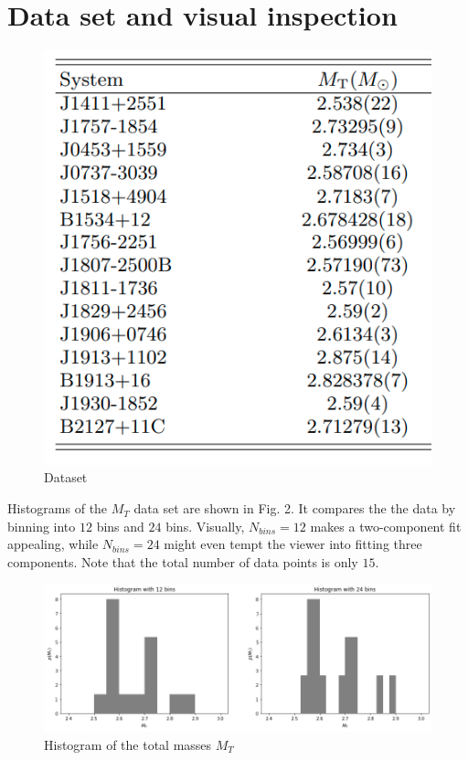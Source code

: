 \documentclass[journal,12pt,twocolumn]{IEEEtran}
\begin{document}
\section{Data set and visual inspection}
\begin{figure}[h]
\centering
\includegraphics[scale=0.5]{fig/data_screenshot.png}
\caption{Dataset}
\end{figure}
Histograms of the $M_T$ data set are shown in Fig. 2. It compares the  the data by binning into $12$ bins and $24$ bins. Visually, $N_{bins} = 12$ makes a two-component fit appealing, while $N_{bins} = 24$ might even tempt the viewer into fitting three components. Note that the total number of data points is only $15$.
\begin{figure}[h]
\centering
\includegraphics[width=\textwidth]{fig/hist.png}
\caption{Histogram of the total masses $M_T$}
\end{figure}
\end{document}
